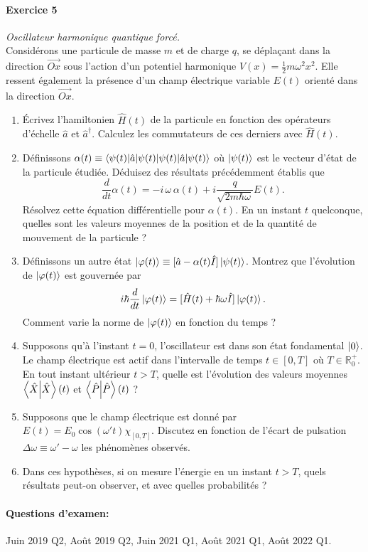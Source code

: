 \paragraph{Exercice 5} \textit{Oscillateur harmonique quantique forcé.} \\
Considérons une particule de masse $m$ et de charge $q$, se déplaçant dans la direction $\vec{Ox}$ sous l'action d'un potentiel harmonique $V(x) = \frac{1}{2}m\omega^2 x^2$. Elle ressent également la présence d'un champ électrique variable $E(t)$ orienté dans la direction $\vec{Ox}$.
\begin{enumerate}
\item Écrivez l'hamiltonien $\hat H(t)$ de la particule en fonction des opérateurs d'échelle $\hat a$ et $\hat a^\dagger$. Calculez les commutateurs de ces derniers avec $\hat H(t)$. 
\item Définissons $\alpha(t) \equiv \braket{\psi(t)|\hat a|\psi(t)}$ où $\ket{\psi(t)}$ est le vecteur d'état de la particule étudiée. Déduisez des résultats précédemment établis que
\begin{equation}
\frac{d}{dt} \alpha(t) = -i\, \omega \, \alpha (t) + i \frac{q}{\sqrt{2m\hbar\omega}}E(t).
\end{equation}
Résolvez cette équation différentielle pour $\alpha(t)$. En un instant $t$ quelconque, quelles sont les valeurs moyennes de la position et de la quantité de mouvement de la particule ?
\item Définissons un autre état $\ket{\varphi(t)} \equiv [\hat a - \alpha(t) \hat I]\ket{\psi(t)}$. Montrez que l'évolution de $\ket{\varphi(t)}$ est gouvernée par
\begin{equation}
i\hbar \frac{d}{dt} \ket{\varphi(t)} = [\hat H(t) + \hbar \omega \hat I] \ket{\varphi(t)}.
\end{equation}
Comment varie la norme de $\ket{\varphi(t)}$ en fonction du temps ?
\item Supposons qu'à l'instant $t=0$, l'oscillateur est dans son état fondamental $\ket{0}$. Le champ électrique est actif dans l'intervalle de temps $t\in[0,T]$ où $T \in \mathbb{R}_0^+$. En tout instant ultérieur $t>T$, quelle est l'évolution des valeurs moyennes $\braket{\hat X}(t)$ et $\braket{\hat P}(t)$ ?
\item Supposons que le champ électrique est donné par $E(t) = E_0 \cos (\omega't) \chi_{[0,T]}$. Discutez en fonction de l'écart de pulsation $\Delta \omega \equiv \omega'-\omega$ les phénomènes observés.
\item Dans ces hypothèses, si on mesure l'énergie en un instant $t>T$, quels résultats peut-on observer, et avec quelles probabilités ?
\end{enumerate}

\paragraph{Questions d'examen:} Juin 2019 Q2, Août 2019 Q2, Juin 2021 Q1, Août 2021 Q1, Août 2022 Q1.